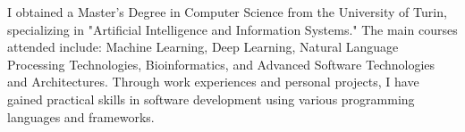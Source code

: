 \par{
	I obtained a Master's Degree in Computer Science from the University of Turin, specializing in "Artificial Intelligence and Information Systems." The main courses attended include: Machine Learning, Deep Learning, Natural Language Processing Technologies, Bioinformatics, and Advanced Software Technologies and Architectures.
	Through work experiences and personal projects, I have gained practical skills in software development using various programming languages and frameworks.
}
\smallskip

